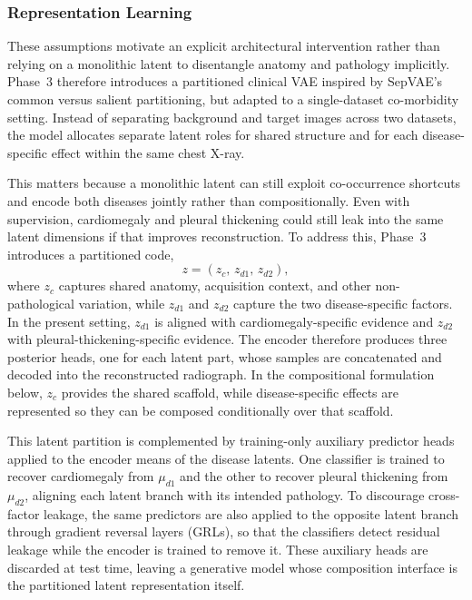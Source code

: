 
\subsubsection{Representation Learning}

These assumptions motivate an explicit architectural intervention rather than relying on a monolithic latent to disentangle anatomy and pathology implicitly. Phase~3 therefore introduces a partitioned clinical VAE inspired by SepVAE's common versus salient partitioning, but adapted to a single-dataset co-morbidity setting. Instead of separating background and target images across two datasets, the model allocates separate latent roles for shared structure and for each disease-specific effect within the same chest X-ray.

This matters because a monolithic latent can still exploit co-occurrence shortcuts and encode both diseases jointly rather than compositionally. Even with supervision, cardiomegaly and pleural thickening could still leak into the same latent dimensions if that improves reconstruction. To address this, Phase~3 introduces a partitioned code,
\begin{equation}
    z = (z_c,\, z_{d1},\, z_{d2}),
\end{equation}
where $z_c$ captures shared anatomy, acquisition context, and other non-pathological variation, while $z_{d1}$ and $z_{d2}$ capture the two disease-specific factors. In the present setting, $z_{d1}$ is aligned with cardiomegaly-specific evidence and $z_{d2}$ with pleural-thickening-specific evidence. The encoder therefore produces three posterior heads, one for each latent part, whose samples are concatenated and decoded into the reconstructed radiograph. In the compositional formulation below, \(z_c\) provides the shared scaffold, while disease-specific effects are represented so they can be composed conditionally over that scaffold.

This latent partition is complemented by training-only auxiliary predictor heads applied to the encoder means of the disease latents. One classifier is trained to recover cardiomegaly from $\mu_{d1}$ and the other to recover pleural thickening from $\mu_{d2}$, aligning each latent branch with its intended pathology. To discourage cross-factor leakage, the same predictors are also applied to the opposite latent branch through gradient reversal layers (GRLs), so that the classifiers detect residual leakage while the encoder is trained to remove it. These auxiliary heads are discarded at test time, leaving a generative model whose composition interface is the partitioned latent representation itself.

